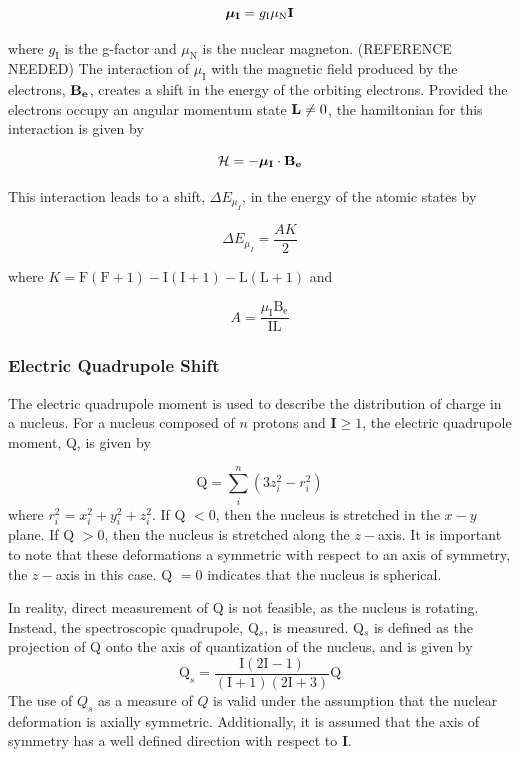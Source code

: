 \begin{equation}
\boldsymbol{\mu}_{\mathrm{\bf{I}}} = g_{\mathrm{I}}\mu_{\mathrm{N}}\mathrm{\bf{I}}
\end{equation}

where $g_{\mathrm{I}}$ is the g-factor and $\mu_{\mathrm{N}}$ is the nuclear magneton. (REFERENCE NEEDED) The interaction of $\mu_{\mathrm{I}}$ with the magnetic field produced by the electrons, $\mathrm{\bf{B_e}}$, creates a shift in the energy of the orbiting electrons. Provided the electrons occupy an angular momentum state $\mathrm{\bf{L}} \neq 0$, the hamiltonian for this interaction is given by

\begin{equation}
\mathcal{H} = -\boldsymbol{\mu}_{\mathrm{\bf{I}}} \cdot \mathrm{\bf{B_e}}
\end{equation}

This interaction leads to a shift, $\Delta E_{\mu_I}$, in the energy of the atomic states by

\begin{equation}
\Delta E_{\mu_I} = \frac{AK}{2}
\end{equation}

where $K = \mathrm{F(F+1) - I(I+1) - L(L+1)}$ and 

\begin{equation}
A = \frac{\mu_{\mathrm{I}}\mathrm{B_e}}{\mathrm{IL}}
\end{equation}

\subsubsection*{Electric Quadrupole Shift}
The electric quadrupole moment is used to describe the distribution of charge in a nucleus. For a nucleus composed of $n$ protons and $\mathbf{I}\geq1$, the electric quadrupole moment, Q, is given by

\begin{equation}
\mathrm{Q} = \sum_i^n (3z_i^2-r_i^2)
\end{equation}
where $r_i^2 = x_i^2+y_i^2+z_i^2$. If Q $ < 0$, then the nucleus is stretched in the $x-y$ plane. If Q $ > 0$, then the nucleus is stretched along the $z-$axis. It is important to note that these deformations a symmetric with respect to an axis of symmetry, the $z-$axis in this case. Q $=0$ indicates that the nucleus is spherical. 

In reality, direct measurement of Q is not feasible, as the nucleus is rotating. Instead, the spectroscopic quadrupole, Q$_s$, is measured. Q$_s$ is defined as the projection of Q onto the axis of quantization of the nucleus, and is given by
\begin{equation}
\mathrm{Q}_s = \frac{\mathrm{I}(2\mathrm{I}-1)}{(\mathrm{I}+1)(2\mathrm{I}+3)}\mathrm{Q}
\end{equation}
The use of $Q_s$ as a measure of $Q$ is valid under the assumption that the nuclear deformation is axially symmetric. Additionally, it is assumed that the axis of symmetry has a well defined direction with respect to \textbf{I}.

